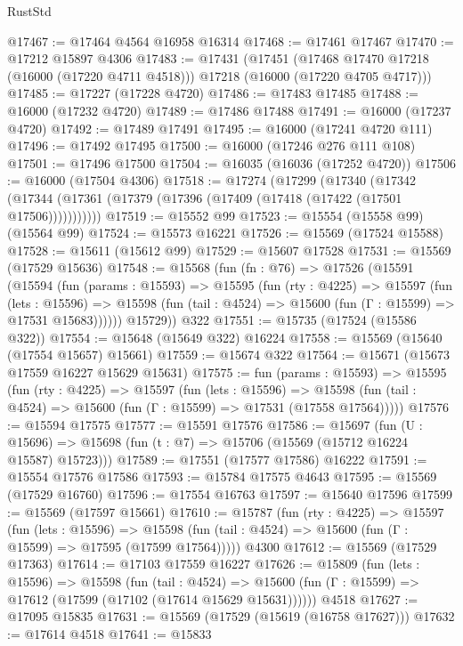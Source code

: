 \begin{lexlean}{RustStd}
\begin{coremodule}
@17467 := @17464 @4564 @16958 @16314
@17468 := @17461 @17467
@17470 := @17212 @15897 @4306
@17483 := @17431
    (@17451
      (@17468 @17470 @17218 (@16000 (@17220 @4711 @4518)))
      @17218
      (@16000 (@17220 @4705 @4717)))
@17485 := @17227 (@17228 @4720)
@17486 := @17483 @17485
@17488 := @16000 (@17232 @4720)
@17489 := @17486 @17488
@17491 := @16000 (@17237 @4720)
@17492 := @17489 @17491
@17495 := @16000 (@17241 @4720 @111)
@17496 := @17492 @17495
@17500 := @16000 (@17246 @276 @111 @108)
@17501 := @17496 @17500
@17504 := @16035 (@16036 (@17252 @4720))
@17506 := @16000 (@17504 @4306)
@17518 := @17274
    (@17299
      (@17340
        (@17342 (@17344 (@17361 (@17379 (@17396 (@17409 (@17418 (@17422 (@17501 @17506)))))))))))
@17519 := @15552 @99
@17523 := @15554 (@15558 @99) (@15564 @99)
@17524 := @15573 @16221
@17526 := @15569 (@17524 @15588)
@17528 := @15611 (@15612 @99)
@17529 := @15607 @17528
@17531 := @15569 (@17529 @15636)
@17548 := @15568
    (fun (fn : @76) =>
    @17526
      (@15591
        (@15594
          (fun (params : @15593) =>
          @15595
            (fun (rty : @4225) =>
            @15597
              (fun (lets : @15596) =>
              @15598 (fun (tail : @4524) => @15600 (fun (Γ : @15599) => @17531 @15683))))))
        @15729))
    @322
@17551 := @15735 (@17524 (@15586 @322))
@17554 := @15648 (@15649 @322) @16224
@17558 := @15569 (@15640 (@17554 @15657) @15661)
@17559 := @15674 @322
@17564 := @15671 (@15673 @17559 @16227 @15629 @15631)
@17575 := fun (params : @15593) =>
  @15595
    (fun (rty : @4225) =>
    @15597
      (fun (lets : @15596) =>
      @15598 (fun (tail : @4524) => @15600 (fun (Γ : @15599) => @17531 (@17558 @17564)))))
@17576 := @15594 @17575
@17577 := @15591 @17576
@17586 := @15697
    (fun (U : @15696) => @15698 (fun (t : @7) => @15706 (@15569 (@15712 @16224 @15587) @15723)))
@17589 := @17551 (@17577 @17586) @16222
@17591 := @15554 @17576 @17586
@17593 := @15784 @17575 @4643
@17595 := @15569 (@17529 @16760)
@17596 := @17554 @16763
@17597 := @15640 @17596
@17599 := @15569 (@17597 @15661)
@17610 := @15787
    (fun (rty : @4225) =>
    @15597
      (fun (lets : @15596) =>
      @15598 (fun (tail : @4524) => @15600 (fun (Γ : @15599) => @17595 (@17599 @17564)))))
    @4300
@17612 := @15569 (@17529 @17363)
@17614 := @17103 @17559 @16227
@17626 := @15809
    (fun (lets : @15596) =>
    @15598
      (fun (tail : @4524) =>
      @15600 (fun (Γ : @15599) => @17612 (@17599 (@17102 (@17614 @15629 @15631))))))
    @4518
@17627 := @17095 @15835
@17631 := @15569 (@17529 (@15619 (@16758 @17627)))
@17632 := @17614 @4518
@17641 := @15833

\end{coremodule}
\end{lexlean}

